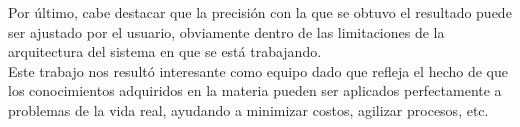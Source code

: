 \documentclass{article}
\begin{document}
Por \'ultimo, cabe destacar que la precisi\'on con la que se obtuvo el resultado puede ser ajustado por el usuario, obviamente dentro de las limitaciones de la arquitectura del sistema en que se est\'a trabajando.\\

Este trabajo nos result\'o interesante como equipo dado que refleja el hecho de que los conocimientos adquiridos en la materia pueden ser aplicados perfectamente a problemas de la vida real, ayudando a minimizar costos, agilizar procesos, etc. 
\end{document}
